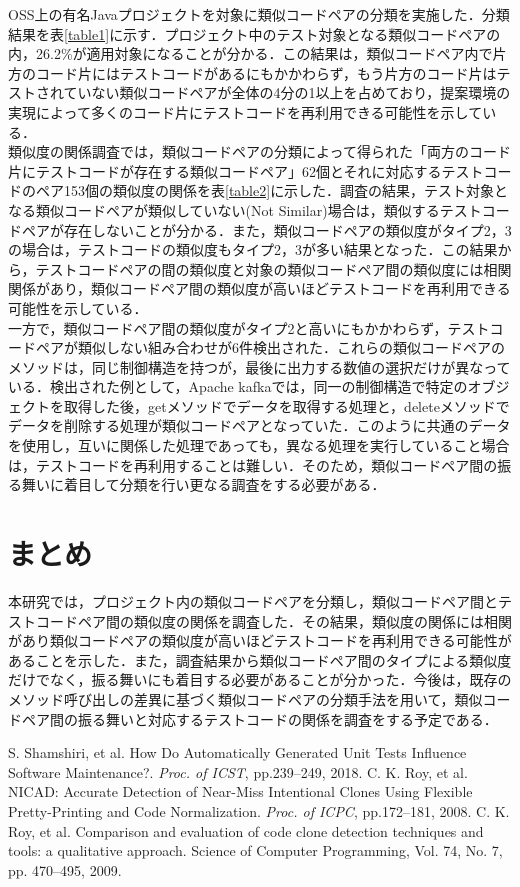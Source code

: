 \documentclass{fose2019}           %
\begin{document}
OSS上の有名Javaプロジェクトを対象に類似コードペアの分類を実施した．分類結果を表\ref{table1}に示す．プロジェクト中のテスト対象となる類似コードペアの内，26.2\%が適用対象になることが分かる．この結果は，類似コードペア内で片方のコード片にはテストコードがあるにもかかわらず，もう片方のコード片はテストされていない類似コードペアが全体の4分の1以上を占めており，提案環境の実現によって多くのコード片にテストコードを再利用できる可能性を示している．
\\\indent 類似度の関係調査では，類似コードペアの分類によって得られた「両方のコード片にテストコードが存在する類似コードペア」62個とそれに対応するテストコードのペア153個の類似度の関係を表\ref{table2}に示した．調査の結果，テスト対象となる類似コードペアが類似していない(Not Similar)場合は，類似するテストコードペアが存在しないことが分かる．また，類似コードペアの類似度がタイプ2，3の場合は，テストコードの類似度もタイプ2，3が多い結果となった．この結果から，テストコードペアの間の類似度と対象の類似コードペア間の類似度には相関関係があり，類似コードペア間の類似度が高いほどテストコードを再利用できる可能性を示している．
\\\indent 一方で，類似コードペア間の類似度がタイプ2と高いにもかかわらず，テストコードペアが類似しない組み合わせが6件検出された．これらの類似コードペアのメソッドは，同じ制御構造を持つが，最後に出力する数値の選択だけが異なっている．検出された例として，Apache kafkaでは，同一の制御構造で特定のオブジェクトを取得した後，getメソッドでデータを取得する処理と，deleteメソッドでデータを削除する処理が類似コードペアとなっていた．このように共通のデータを使用し，互いに関係した処理であっても，異なる処理を実行していること場合は，テストコードを再利用することは難しい．そのため，類似コードペア間の振る舞いに着目して分類を行い更なる調査をする必要がある．

\section{まとめ}
本研究では，プロジェクト内の類似コードペアを分類し，類似コードペア間とテストコードペア間の類似度の関係を調査した．その結果，類似度の関係には相関があり類似コードペアの類似度が高いほどテストコードを再利用できる可能性があることを示した．また，調査結果から類似コードペア間のタイプによる類似度だけでなく，振る舞いにも着目する必要があることが分かった．今後は，既存のメソッド呼び出しの差異に基づく類似コードペアの分類手法を用いて，類似コードペア間の振る舞いと対応するテストコードの関係を調査をする予定である．
%

\begin{thebibliography}{2}
 S. Shamshiri, et al. How Do Automatically Generated Unit Tests Influence Software Maintenance?. {\it Proc. of ICST}, pp.239--249, 2018. 
 C. K. Roy, et al. NICAD: Accurate Detection of Near-Miss Intentional Clones Using Flexible Pretty-Printing and Code Normalization. {\it Proc. of ICPC}, pp.172--181, 2008.
 C. K. Roy, et al. Comparison and evaluation of code clone detection techniques and tools: a qualitative approach. Science of Computer Programming, Vol. 74, No. 7, pp. 470–495, 2009.
\end{thebibliography}
\end{document}
